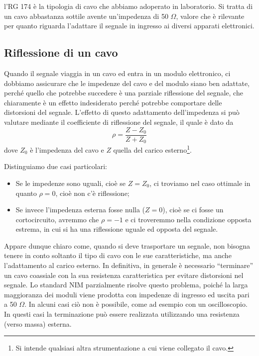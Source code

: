 l'RG 174 è la tipologia di cavo che abbiamo adoperato in laboratorio. Si tratta di un cavo abbastanza sottile avente un'impedenza di 50 $\Omega$, valore che è rilevante per quanto riguarda l'adattare il segnale in ingresso ai diversi apparati elettronici.

\subsection{Riflessione di un cavo}
Quando il segnale viaggia in un cavo ed entra in un modulo elettronico, ci dobbiamo assicurare che le impedenze del cavo e del modulo siano ben adattate, perché quello che potrebbe succedere è una parziale riflessione del segnale, che chiaramente è un effetto indesiderato perché potrebbe comportare delle distorsioni del segnale. L'effetto di questo adattamento dell'impedenza si può valutare mediante il coefficiente di riflessione del segnale, il quale è dato da
\begin{equation*}
   \rho=\frac{Z - Z_0}{Z + Z_0}
\end{equation*}
dove $Z_0$ è l'impedenza del cavo e $Z$ quella del carico esterno\footnote{Si intende qualsiasi altra strumentazione a cui viene collegato il cavo.}.

Distinguiamo due casi particolari:

\begin{itemize}[leftmargin=0.5cm]
   \item Se le impedenze sono uguali, cioè se $Z=Z_0$, ci troviamo nel caso ottimale in quanto $\rho=0$, cioè non c'è riflessione;
   \item Se invece l'impedenza esterna fosse nulla ($Z=0$), cioè se ci fosse un cortocircuito, avremmo che $\rho=-1$ e ci troveremmo nella condizione opposta estrema, in cui si ha una riflessione uguale ed opposta del segnale.
\end{itemize}
Appare dunque chiaro come, quando si deve trasportare un segnale, non bisogna tenere in conto soltanto il tipo di cavo con le sue caratteristiche, ma anche l'adattamento al carico esterno. In definitiva, in generale è necessario “terminare” un cavo coassiale con la sua resistenza caratteristica per evitare distorsioni nel segnale. Lo standard NIM parzialmente risolve questo problema, poiché la larga maggioranza dei moduli viene prodotta con impedenze di ingresso ed uscita pari a 50 $\Omega$. In alcuni casi ciò non è possibile, come ad esempio con un oscilloscopio. In questi casi la terminazione può essere realizzata utilizzando una resistenza (verso massa) esterna.

